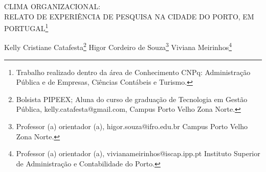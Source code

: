 \documentclass[article,12pt,onesidea,4paper,english,brazil]{abntex2}
\begin{document}
	
	
	\frenchspacing 
	
	\begin{center}
		\LARGE CLIMA ORGANIZACIONAL:\\RELATO DE EXPERIÊNCIA DE PESQUISA NA CIDADE DO PORTO, EM PORTUGAL\footnote{Trabalho realizado dentro da área de Conhecimento CNPq: Administração Pública e de Empresas, Ciências Contábeis e Turismo.}
		
		\normalsize
	Kelly Cristiane Catafesta\footnote{Bolsista PIPEEX; Aluna do curso de graduação de Tecnologia em Gestão Pública, kelly.catafesta@gmail.com, Campus Porto Velho Zona Norte.} 
	Higor Cordeiro de Souza\footnote{Professor (a) orientador (a), higor.souza@ifro.edu.br Campus Porto Velho Zona Norte.} 
	Viviana Meirinhos\footnote{Professor (a) orientador (a), vivianameirinhos@iscap.ipp.pt Instituto Superior de Administração e Contabilidade do Porto.} 
	\end{center}
	
\end{document}
